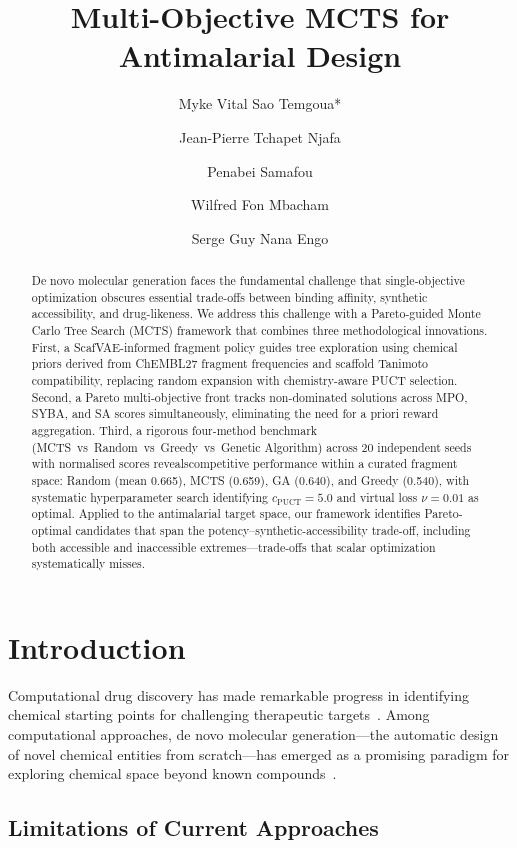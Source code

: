 \documentclass[jcim,article,layout=manuscript]{achemso}
\title{Multi-Objective MCTS for Antimalarial Design}
\author{Myke Vital Sao Temgoua*}
\author{Jean-Pierre Tchapet Njafa}
\author{Penabei Samafou}
\author{Wilfred Fon Mbacham}
\author{Serge Guy Nana Engo}
\affiliation{
  Department of Physics, Faculty of Science, University of Yaound\'{e} I,
  P.O. Box 812, Yaound\'{e}, Cameroon
}
\begin{document}
\begin{abstract}
De novo molecular generation faces the fundamental challenge that single-objective
optimization obscures essential trade-offs between binding affinity, synthetic
accessibility, and drug-likeness. We address this
challenge with a Pareto-guided Monte Carlo Tree Search (MCTS) framework
that combines three methodological innovations. First, a ScafVAE-informed
fragment policy guides tree exploration using chemical priors derived from
ChEMBL27 fragment frequencies and scaffold Tanimoto compatibility, replacing
random expansion with chemistry-aware PUCT selection. Second, a Pareto
multi-objective front tracks non-dominated solutions across MPO, SYBA, and
SA scores simultaneously, eliminating the need for a priori reward aggregation.
Third, a rigorous four-method benchmark (MCTS~vs~Random~vs~Greedy~vs~Genetic
Algorithm) across 20 independent seeds with normalised scores revealscompetitive performance within a curated fragment space: Random (mean 0.665), MCTS (0.659), GA (0.640), and Greedy (0.540), with systematic hyperparameter search identifying
$c_{\text{PUCT}}=5.0$ and virtual loss $\nu=0.01$ as optimal. Applied to the antimalarial target space,
our framework identifies Pareto-optimal candidates that span the
potency--synthetic-accessibility trade-off, including both accessible
and inaccessible extremes---trade-offs that scalar optimization
systematically misses.
\end{abstract}

\section{Introduction}

Computational drug discovery has made remarkable progress in identifying
chemical starting points for challenging therapeutic targets~\cite{Wells2015}.
Among computational approaches, de novo molecular generation---the automatic
design of novel chemical entities from scratch---has emerged as a promising
paradigm for exploring chemical space beyond known compounds~\cite{GDPLarge2019,
Olivecrona2017, ZielStroth2020}.

\subsection{Limitations of Current Approaches}
\end{document}
